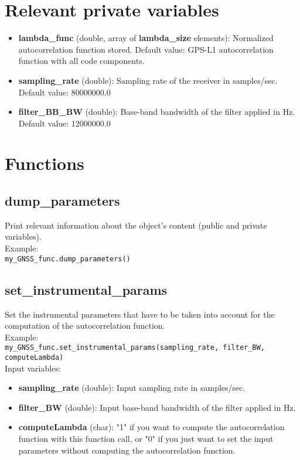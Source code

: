 \section{Relevant private variables}

\begin{itemize}
\item {\bf lambda\_func} (double, array of {\bf lambda\_size} elements): Normalized autocorrelation function stored. Default value: GPS-L1 autocorrelation function with all code components.

\item {\bf sampling\_rate} (double): Sampling rate of the receiver in samples/sec. Default value: 80000000.0

\item {\bf filter\_BB\_BW} (double): Base-band bandwidth of the filter applied in Hz. Default value: 12000000.0
\end{itemize}

\section{Functions}

\subsection{dump\_parameters}

Print relevant information about the object's content (public and private variables).\\

Example:\\

\texttt{my\_GNSS\_func.dump\_parameters()}\\


\subsection{set\_instrumental\_params}

Set the instrumental parameters that have to be taken into account for the computation of the autocorrelation function.\\

Example:\\

\texttt{my\_GNSS\_func.set\_instrumental\_params(sampling\_rate, filter\_BW, computeLambda)}\\

Input variables:
\begin{itemize}
\item {\bf sampling\_rate} (double): Input sampling rate in samples/sec.
\item {\bf filter\_BW} (double): Input base-band bandwidth of the filter applied in Hz.
\item {\bf computeLambda} (char): "1" if you want to compute the autocorrelation function with this function call, or "0" if you just want to set the input parameters without computing the autocorrelation function.
\end{itemize}


